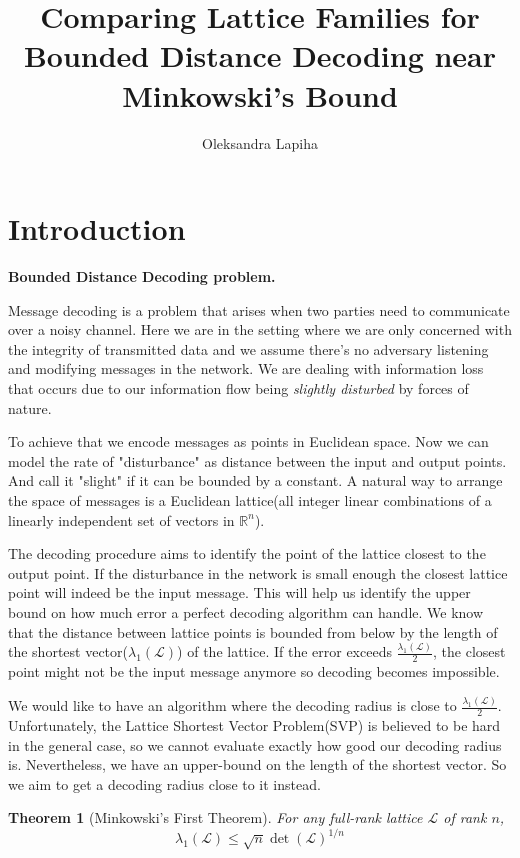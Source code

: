 \documentclass[12pt]{article}
\title{Comparing Lattice Families for Bounded Distance Decoding near Minkowski’s Bound}
\author{ Oleksandra Lapiha }
\newcommand{\LL}{\mathcal{L}}
\newtheorem{theorem}{Theorem}
\begin{document}
\maketitle



\section{Introduction}
\label{sec:intro}



\textbf{Bounded Distance Decoding problem.}

Message decoding is a problem that arises when two parties need to communicate over a noisy channel. Here we are in the setting where we are only concerned with the integrity of transmitted data and we assume there's no adversary listening and modifying messages in the network. We are dealing with information loss that occurs due to our information flow being \textit{slightly disturbed} by forces of nature.

To achieve that we encode messages as points in Euclidean space. Now we can model the rate of "disturbance" as distance between the input and output points. And call it "slight" if it can be bounded by a constant. A natural way to arrange the space of messages is a Euclidean lattice(all integer linear combinations of a linearly independent set of vectors in $\mathbb{R}^{n}$).

The decoding procedure aims to identify the point of the lattice closest to the output point. If the disturbance in the network is small enough the closest lattice point will indeed be the input message. This will help us identify the upper bound on how much error a perfect decoding algorithm can handle. We know that the distance between lattice points is bounded from below by the length of the shortest vector($\lambda_{1}(\LL)$) of the lattice. If the error exceeds $\frac{\lambda_{1}(\LL)}{2}$, the closest point might not be the input message anymore so decoding becomes impossible.

We would like to have an algorithm where the decoding radius is close to $\frac{\lambda_{1}(\LL)}{2}$. Unfortunately, the Lattice Shortest Vector Problem(SVP) is believed to be hard in the general case, so we cannot evaluate exactly how good our decoding radius is. Nevertheless, we have an upper-bound on the length of the shortest vector. So we aim to get a decoding radius close to it instead.
\begin{theorem}[Minkowski's First Theorem]
    For any full-rank lattice $\LL$ of rank $n$,
    \[
        \lambda_{1}(\LL) \leq \sqrt{n} \det(\LL)^{1/n}
    \]
\end{theorem}
\end{document}
